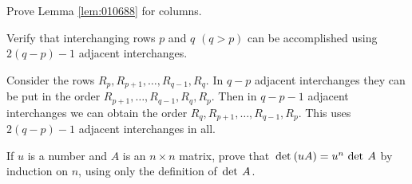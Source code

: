 \begin{multicols}{2}
\begin{ex}
Prove Lemma \ref{lem:010688} for columns.
\end{ex}

\begin{ex}
Verify that interchanging rows $p$ and $q$ $(q > p)$ can be accomplished using $2(q - p) - 1$ adjacent interchanges.

\begin{sol}
Consider the rows $R_{p}, R_{p+1}, \dots , R_{q-1}, R_{q}$. In $q - p$ adjacent interchanges they can be put in the order $R_{p+1}, \dots , R_{q-1}, R_{q}, R_{p}$. Then in $q - p - 1$ adjacent interchanges we can obtain the order $R_{q}, R_{p+1}, \dots , R_{q-1}, R_{p}$. This uses $2(q - p) -1$ adjacent interchanges in all.
\end{sol}
\end{ex}


\columnbreak
\begin{ex}
If $u$ is a number and $A$ is an $n \times n$ matrix, prove that $\thinspace\operatorname{det\medspace}(uA) = u^{n} \thinspace\operatorname{det \medspace}A$ by induction on $n$, using only the definition of $\thinspace\operatorname{det \medspace}A$.
\end{ex}

\end{multicols}


